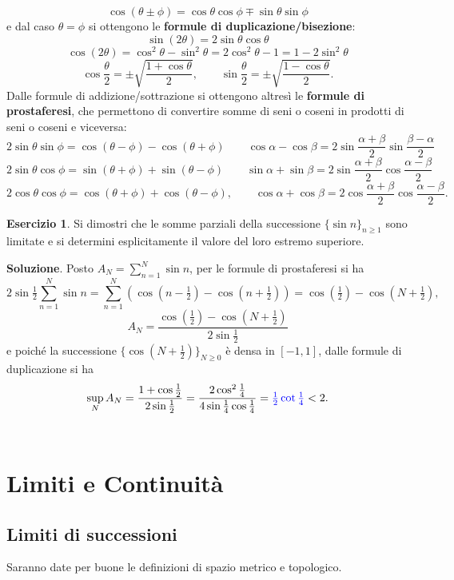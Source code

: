 \documentclass[a4paper,twoside]{article}
\theoremstyle{definition}
\newtheorem{ex}[theorem]{Esercizio}
\numberwithin{theorem}{section}
\begin{document}
$$ \cos(\theta\pm\phi)=\cos\theta\cos\phi \mp \sin\theta\sin\phi $$
e dal caso $\theta=\phi$ si ottengono le \textbf{formule di duplicazione/bisezione}:
$$ \sin(2\theta) = 2\sin\theta\cos\theta $$
$$ \cos(2\theta) = \cos^2\theta-\sin^2\theta = 2\cos^2\theta - 1 = 1-2\sin^2\theta $$
$$ \cos\frac{\theta}{2}=\pm\sqrt{\frac{1+\cos\theta}{2}},\qquad \sin\frac{\theta}{2}=\pm\sqrt{\frac{1-\cos\theta}{2}}.$$
Dalle formule di addizione/sottrazione si ottengono altresì le \textbf{formule di prostaferesi}, che permettono di convertire somme di seni o coseni in prodotti di seni o coseni e viceversa:
$$ 2\sin\theta\sin\phi = \cos(\theta-\phi)-\cos(\theta+\phi)\qquad \cos\alpha-\cos\beta = 2\sin\frac{\alpha+\beta}{2}\sin\frac{\beta-\alpha}{2} $$
$$ 2\sin\theta\cos\phi = \sin(\theta+\phi)+\sin(\theta-\phi)\qquad \sin\alpha+\sin\beta = 2\sin\frac{\alpha+\beta}{2}\cos\frac{\alpha-\beta}{2} $$
$$ 2\cos\theta\cos\phi = \cos(\theta+\phi)+\cos(\theta-\phi),\qquad \cos\alpha+\cos\beta = 2\cos\frac{\alpha+\beta}{2}\cos\frac{\alpha-\beta}{2}. $$

\begin{ex} Si dimostri che le somme parziali della successione $\{\sin n\}_{n\geq 1}$ sono limitate e si determini esplicitamente il valore del loro estremo superiore. 
\end{ex}
\textbf{Soluzione}. Posto $A_N=\sum_{n=1}^{N}\sin n$, per le formule di prostaferesi si ha 
$$ 2\sin\tfrac{1}{2}\sum_{n=1}^{N}\sin n = \sum_{n=1}^{N}\left(\cos\left(n-\tfrac{1}{2}\right)-\cos\left(n+\tfrac{1}{2}\right)\right)=\cos\left(\tfrac{1}{2}\right)-\cos\left(N+\tfrac{1}{2}\right) ,$$
$$ A_N = \frac{\cos\left(\tfrac{1}{2}\right)-\cos\left(N+\tfrac{1}{2}\right)}{2\sin\tfrac{1}{2}} $$
e poiché la successione $\{\cos\left(N+\frac{1}{2}\right)\}_{N\geq 0}$ è densa in $[-1,1]$, dalle formule di duplicazione si ha 
$$ \sup_N A_N = \frac{1+\cos\tfrac{1}{2}}{2\sin\tfrac{1}{2}} = \frac{2\cos^2\tfrac{1}{4}}{4\sin\tfrac{1}{4}\cos\tfrac{1}{4}} = {\color{blue}\tfrac{1}{2}\cot\tfrac{1}{4}}<2.$$
\\

\section{Limiti e Continuità}
\subsection{Limiti di successioni}
Saranno date per buone le definizioni di spazio metrico e topologico.
\end{document}
